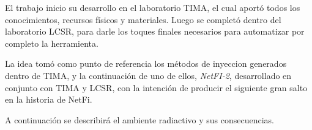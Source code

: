 El trabajo inicio su desarrollo en el laboratorio TIMA, el cual aportó todos los conocimientos, recursos físicos  y materiales. Luego se completó dentro del laboratorio LCSR, para darle los toques finales necesarios para automatizar por completo la herramienta.

La idea  tomó como punto de referencia los métodos de inyeccion generados dentro de TIMA, y la continuación de uno de ellos, \emph{NetFI-2}, desarrollado en conjunto con TIMA y LCSR, con la intención de producir el siguiente gran salto en la historia de NetFi.

A continuación se describirá el ambiente radiactivo y sus consecuencias.